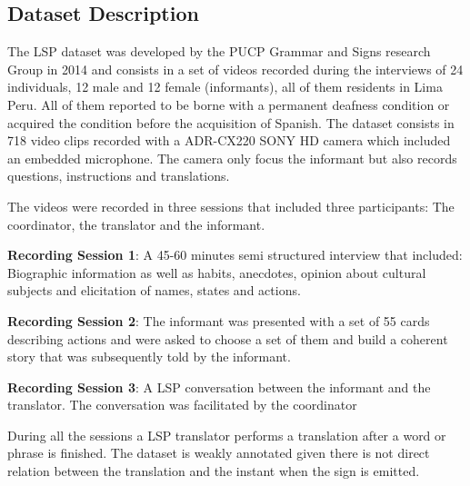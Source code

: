 \documentclass[twocolumn]{article}
\begin{document}
\subsection{Dataset Description \cite{lsp_dataset}}\label{datasetdesc}
The LSP dataset was developed by the PUCP Grammar and Signs research Group in 2014 and consists in a set of videos recorded during the interviews of 24 individuals, 12 male and 12 female (informants), all of them residents in Lima Peru. All of them reported to be borne with a permanent deafness condition or acquired the condition before the acquisition of Spanish. The dataset consists in 718 video clips recorded with a ADR-CX220 SONY HD camera which included an embedded microphone. The camera only focus the informant but also records questions, instructions and translations.

The videos were recorded in three sessions that included three participants: The coordinator, the translator and the informant.

\textbf{Recording Session 1}: A 45-60 minutes semi structured interview that included: Biographic information as well as habits, anecdotes, opinion about cultural subjects and elicitation of names, states and actions. 

\textbf{Recording Session 2}: The informant was presented with a set of 55 cards describing actions and were asked to choose a set of them and build a coherent story that was subsequently told by the informant.

\textbf{Recording Session 3}: A LSP conversation between the informant and the translator. The conversation was facilitated by the coordinator

During all the sessions a LSP translator performs a translation after a word or phrase is finished. The dataset is weakly annotated given there is not direct relation between the translation and the instant when the sign is emitted.
\end{document}

